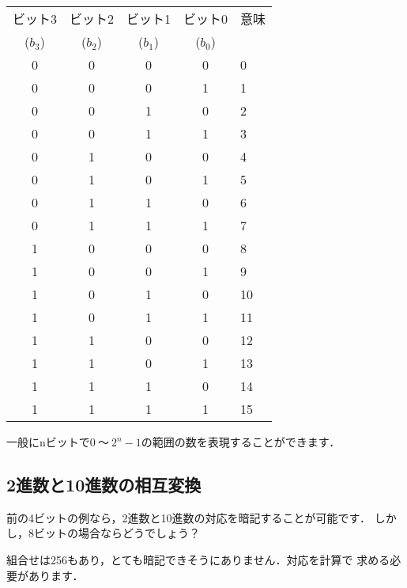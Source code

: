 \begin{center}
{\footnotesize
\begin{tabular}{|c|c|c|c|l }
\cline{1-4}
{\footnotesize ビット3}&
{\footnotesize ビット2}&
{\footnotesize ビット1}&
{\footnotesize ビット0}&意味\\
($b_3$)&($b_2$)&($b_1$)&($b_0$)&\\
\cline{1-4}
 0 &  0 &  0 &  0 &  0 \\
 0 &  0 &  0 &  1 &  1 \\
 0 &  0 &  1 &  0 &  2 \\
 0 &  0 &  1 &  1 &  3 \\
 0 &  1 &  0 &  0 &  4 \\
 0 &  1 &  0 &  1 &  5 \\
 0 &  1 &  1 &  0 &  6 \\
 0 &  1 &  1 &  1 &  7 \\
 1 &  0 &  0 &  0 &  8 \\
 1 &  0 &  0 &  1 &  9 \\
 1 &  0 &  1 &  0 & 10 \\
 1 &  0 &  1 &  1 & 11 \\
 1 &  1 &  0 &  0 & 12 \\
 1 &  1 &  0 &  1 & 13 \\
 1 &  1 &  1 &  0 & 14 \\
 1 &  1 &  1 &  1 & 15 \\
\cline{1-4}
\end{tabular}
}
\end{center}

一般にnビットで$0~〜~2^n-1$の範囲の数を表現することができます．

\subsection{2進数と10進数の相互変換}

前の4ビットの例なら，2進数と10進数の対応を暗記することが可能です．
しかし，8ビットの場合ならどうでしょう？

組合せは256もあり，とても暗記できそうにありません．対応を計算で
求める必要があります．

